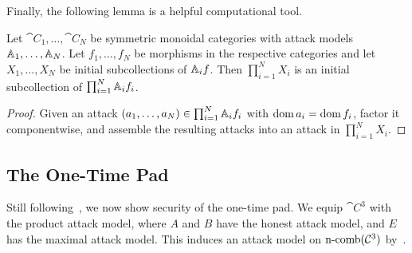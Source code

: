 Finally, the following lemma is a helpful computational tool.

\begin{prop}
  Let $\cat{C}_1,\dots,\cat{C}_N$ be symmetric monoidal categories with attack
  models $\AA_1,\dots,\AA_N$. Let $f_1,\dots,f_N$ be morphisms in the respective
  categories and let $X_1,\dots,X_N$ be initial subcollections of $\AA_i f$.
  Then $\prod_{i=1}^N X_i$ is an initial subcollection of $\prod_{i=1}^N \AA_i f_i$.
\end{prop}

\begin{proof}
  Given an attack $(a_1,\dots,a_N)\in\prod_{i=1}^N \AA_i f_i$ with $\dom a_i =
  \dom f_i$, factor it componentwise, and assemble the resulting attacks into an
  attack in $\prod_{i=1}^N X_i$.
\end{proof}

%

\subsection{The One-Time Pad}

Still following~\cite{broadbent-karvonen-2022}, we now show security of the
one-time pad. We equip $\cat{C}^3$ with the product attack model, where $A$ and
$B$ have the honest attack model, and $E$ has the maximal attack model. This
induces an attack model on $\ncomb{\cat{C}^3}$
by~.

